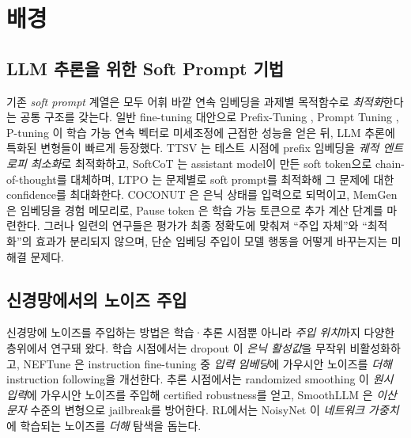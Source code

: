 
\section{배경}
\label{sec:background}

\subsection{LLM 추론을 위한 Soft Prompt 기법}\label{sec:rw_soft_prompt}

기존 \textit{soft prompt} 계열은 모두 어휘 바깥 연속 임베딩을 과제별 목적함수로 \emph{최적화}한다는 공통 구조를 갖는다. 일반 fine-tuning 대안으로 Prefix-Tuning \citep{li2021prefix}, Prompt Tuning \citep{lester2021power}, P-tuning \citep{liu2021gpt}이 학습 가능 연속 벡터로 미세조정에 근접한 성능을 얻은 뒤, LLM 추론에 특화된 변형들이 빠르게 등장했다. TTSV \citep{kang2025model}는 테스트 시점에 prefix 임베딩을 \emph{궤적 엔트로피 최소화}로 최적화하고, SoftCoT \citep{xu2025softcot}는 assistant model이 만든 soft token으로 chain-of-thought를 대체하며, LTPO \citep{ye2025thinking}는 문제별로 soft prompt를 최적화해 그 문제에 대한 confidence를 최대화한다. COCONUT \citep{hao2024training}은 은닉 상태를 입력으로 되먹이고, MemGen \citep{zhang2025memgen}은 임베딩을 경험 메모리로, Pause token \citep{goyal2024think}은 학습 가능 토큰으로 추가 계산 단계를 마련한다. 그러나 일련의 연구들은 평가가 최종 정확도에 맞춰져 ``주입 자체''와 ``최적화''의 효과가 분리되지 않으며, 단순 임베딩 주입이 모델 행동을 어떻게 바꾸는지는 미해결 문제다. 

\subsection{신경망에서의 노이즈 주입}\label{sec:rw_perturbation}

신경망에 노이즈를 주입하는 방법은 학습·추론 시점뿐 아니라 \textit{주입 위치}까지 다양한 층위에서 연구돼 왔다. 학습 시점에서는 dropout \citep{srivastava2014dropout}이 \textit{은닉 활성값}을 무작위 비활성화하고, NEFTune \citep{jain2024neftune}은 instruction fine-tuning 중 \textit{입력 임베딩}에 가우시안 노이즈를 \textit{더해} instruction following을 개선한다. 추론 시점에서는 randomized smoothing \citep{cohen2019certified}이 \textit{원시 입력}에 가우시안 노이즈를 주입해 certified robustness를 얻고, SmoothLLM \citep{robey2023smoothllm}은 \textit{이산 문자} 수준의 변형으로 jailbreak를 방어한다. RL에서는 NoisyNet \citep{fortunato2018noisy}이 \textit{네트워크 가중치}에 학습되는 노이즈를 \textit{더해} 탐색을 돕는다.

